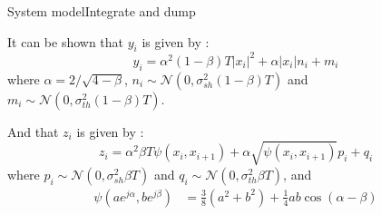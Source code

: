 \documentclass[en]{sdqbeamer}
\begin{document}
\begin{frame}{System model}{Integrate and dump}

It can be shown that $y_i$ is given by :
\begin{equation}
y_i=\alpha^2(1-\beta)T|x_i|^2+\alpha|x_i|n_i+m_i
	\label{eq:y_i_Tukey}
\end{equation}
where $\alpha=2/\sqrt{4-\beta}$, $n_i\sim\mathcal N(0,\sigma^2_{sh}(1-\beta)T)$ and $m_i\sim\mathcal N(0,\sigma^2_{th}(1-\beta)T)$.%

And that $z_i$ is given by :
\begin{equation}
	z_i=\alpha^2\beta T\psi(x_i,x_{i+1})+\alpha\sqrt{\psi(x_i,x_{i+1})}p_i +q_i
	\label{eq:z_i_Tukey}
\end{equation}
where $p_i\sim\mathcal N(0,\sigma^2_{sh}\beta T)$ and $q_i\sim\mathcal N(0,\sigma^2_{th}\beta T)$, and 
\begin{align}
\psi(ae^{j\alpha},be^{j\beta})&=\frac{3}{8}\left(a^2+b^2\right)+\frac{1}{4}ab\cos(\alpha-\beta)
\end{align}



\end{frame}
\end{document}
